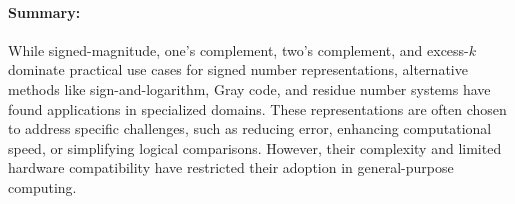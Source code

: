 \paragraph{Summary: } 
While signed-magnitude, one's complement, two's complement, and excess-\( k \) dominate practical use cases for signed number representations, alternative methods like sign-and-logarithm, Gray code, and residue number systems have found applications in specialized domains. These representations are often chosen to address specific challenges, such as reducing error, enhancing computational speed, or simplifying logical comparisons. However, their complexity and limited hardware compatibility have restricted their adoption in general-purpose computing.
